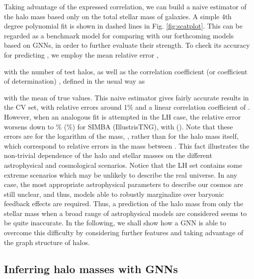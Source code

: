 \documentclass[twocolumn]{aastex631}
\begin{document}
Taking advantage of the expressed correlation, we can build a naive estimator of the halo mass based only on the total stellar mass of galaxies. A simple 4th degree polynomial fit is shown in dashed lines in Fig. \ref{fig:scatplot}. This can be regarded as a benchmark model for comparing with our forthcoming models based on GNNs, in order to further evaluate their strength. To check its accuracy for predicting , we employ the mean relative error , 

with  the number of test halos, as well as the correlation coefficient (or coefficient of determination) , defined in the usual way as

with  the mean of true values. This naive estimator gives fairly accurate results in the CV set, with relative errors around 1\% and a linear correlation coefficient of . However, when an analogous fit is attempted in the LH case, the relative error worsens down to \% (\%) for SIMBA (IllustrisTNG), with  (). Note that these errors are for the logarithm of the mass, , rather than for the halo mass itself, which correspond to relative errors in the mass between . This fact illustrates the non-trivial dependence of the halo and stellar masses on the different astrophysical and cosmological scenarios. Notice that the LH set contains some extreme scenarios which may be unlikely to describe the real universe. In any case, the most appropriate astrophysical parameters to describe our cosmos are still unclear, and thus, models able to robustly marginalize over baryonic feedback effects are required. Thus, a prediction of the halo mass from only the stellar mass when a broad range of astrophysical models are considered seems to be quite inaccurate. In the following, we shall show how a GNN is able to overcome this difficulty by considering further features and taking advantage of the graph structure of halos. 










\subsection{Inferring halo masses with GNNs}
\end{document}

